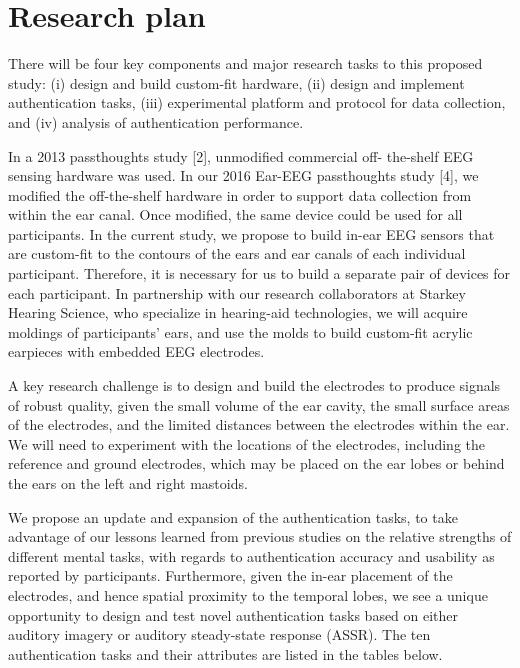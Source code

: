 \documentclass[11pt]{article}
\begin{document}
\section{Research plan}
\label{sec:orga31e397}

There will be four key components and major research tasks to this proposed
study: (i) design and build custom-fit hardware, (ii) design and implement
authentication tasks, (iii) experimental platform and protocol for data collection,
and (iv) analysis of authentication performance.

In a 2013 passthoughts study [2], unmodified commercial off-
the-shelf EEG sensing hardware was used. In our 2016 Ear-EEG passthoughts study [4],
we modified the off-the-shelf hardware in order to support data collection from
within the ear canal. Once modified, the same device could be used for all
participants. In the current study, we propose to build in-ear EEG sensors that
are custom-fit to the contours of the ears and ear canals of each individual
participant. Therefore, it is necessary for us to build a separate pair of devices for
each participant. In partnership with our research collaborators at Starkey
Hearing Science, who specialize in hearing-aid technologies, we will acquire
moldings of participants’ ears, and use the molds to build custom-fit acrylic
earpieces with embedded EEG electrodes.

A key research challenge is to design and build the electrodes to produce signals
of robust quality, given the small volume of the ear cavity, the small surface
areas of the electrodes, and the limited distances between the electrodes within
the ear. We will need to experiment with the locations of the electrodes, including
the reference and ground electrodes, which may be placed on the ear lobes or
behind the ears on the left and right mastoids.

We propose an update and expansion of the authentication tasks, to take
advantage of our lessons learned from previous studies on the relative strengths
of different mental tasks, with regards to authentication accuracy and usability as
reported by participants. Furthermore, given the in-ear placement of the
electrodes, and hence spatial proximity to the temporal lobes, we see a unique
opportunity to design and test novel authentication tasks based on either auditory
imagery or auditory steady-state response (ASSR). The ten authentication tasks and their
attributes are listed in the tables below.
\end{document}
